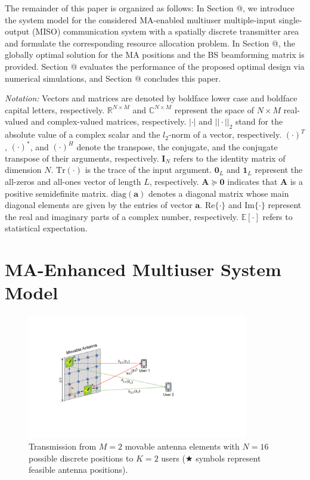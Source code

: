 \documentclass[12pt, draftclsnofoot, onecolumn]{IEEEtran}
\makeatletter
\newcommand*{\rom}[1]{\expandafter\@slowromancap\romannumeral #1@}
\makeatother
\begin{document}
The remainder of this paper is organized as follows: In Section \rom{2}, we introduce the system model for the considered MA-enabled multiuser multiple-input single-output (MISO) communication system with a spatially discrete transmitter area and formulate the corresponding resource allocation problem. In Section \rom{3}, the globally optimal solution for the MA positions and the BS beamforming matrix is provided. Section \rom{4} evaluates the performance of the proposed optimal design via numerical simulations, and Section \rom{5} concludes this paper.

\textit{Notation:} 
Vectors and matrices are denoted by boldface lower case and boldface capital letters, respectively. $\mathbb{R}^{N\times M}$ and $\mathbb{C}^{N\times M}$ represent the space of $N\times M$ real-valued and complex-valued matrices, respectively. $|\cdot|$ and $||\cdot||_2$ stand for the absolute value of a complex scalar and the $l_2$-norm of a vector, respectively. $(\cdot)^T$, $(\cdot)^*$, and $(\cdot)^H$ denote the transpose, the conjugate, and the conjugate transpose of their arguments, respectively. $\mathbf{I}_{N}$ refers to the identity matrix of dimension $N$. $\mathrm{Tr}(\cdot)$ is the trace of the input argument. $\mathbf{0}_{L}$ and $\mathbf{1}_L$ represent the all-zeros and all-ones vector of length $L$, respectively. $\mathbf{A}\succeq\mathbf{0}$ indicates that $\mathbf{A}$ is a positive semidefinite matrix. $\mathrm{diag}(\mathbf{a})$ denotes a diagonal matrix whose main diagonal elements are given by the entries of vector $\mathbf{a}$. 
$\mathrm{Re}\{\cdot\}$ and $\mathrm{Im}\{\cdot\}$ represent the real and imaginary parts of a complex number, respectively. $\mathbb{E}[\cdot]$ refers to statistical expectation.
\section{MA-Enhanced Multiuser System Model}


\begin{figure}
    \centering
    \includegraphics[width=3.8in]{figures/MA_model_ver3}
    \caption{Transmission from $M=2$ movable antenna elements with $N=16$ possible discrete positions to $K=2$ users ($\bigstar$ symbols represent feasible antenna positions).}
    \label{fig:MA_system_model}
\end{figure}
\end{document}
